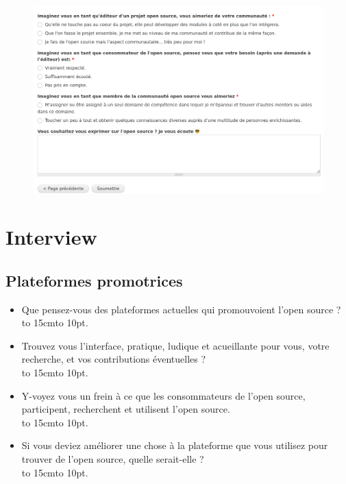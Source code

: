 	\begin{figure}[t]
		\includegraphics[scale=0.25]{./img/f5.png}
	\end{figure}	
\chapter*{Interview}

\section*{Plateformes promotrices}

\begin{itemize}[label=\textbullet, font=\LARGE \color{burntorange}]
	\item Que pensez-vous des plateformes actuelles qui promouvoient l'open source ?\\
	\hbox to 15cm{\leaders\hbox to 10pt{\hss . \hss}\hfil}
	\item Trouvez vous l'interface, pratique, ludique et acueillante pour vous, votre recherche, et vos contributions éventuelles ?\\
	\hbox to 15cm{\leaders\hbox to 10pt{\hss . \hss}\hfil}
	\item Y-voyez vous un frein à ce que les consommateurs de l'open source, participent, recherchent et utilisent l'open source.\\
	\hbox to 15cm{\leaders\hbox to 10pt{\hss . \hss}\hfil}
	\item Si vous deviez améliorer une chose à la plateforme que vous utilisez pour trouver de l'open source, quelle serait-elle ?\\
	\hbox to 15cm{\leaders\hbox to 10pt{\hss . \hss}\hfil}

\end{itemize}

